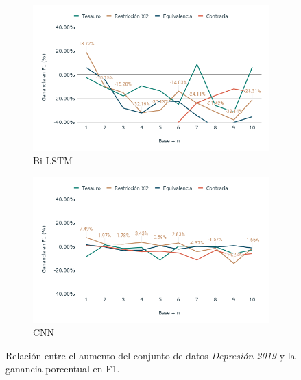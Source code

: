 \begin{figure}[hbt!]
    \begin{subfigure}[b]{0.5\textwidth}
        \includegraphics[width=\textwidth]{sections/figures/bi_LSTM2019.png}
        \caption{Bi-LSTM}
    \end{subfigure}
    \hfill
    \begin{subfigure}[b]{0.5\textwidth}
        \includegraphics[width=\textwidth]{sections/figures/CNN2019.png}
        \caption{CNN}
    \end{subfigure}
    
  

   
    \caption{Relación entre el aumento del conjunto de datos \textit{Depresión 2019} y la ganancia porcentual en F1.}
    \label{fig:aumento_n_depresion19}
\end{figure}
